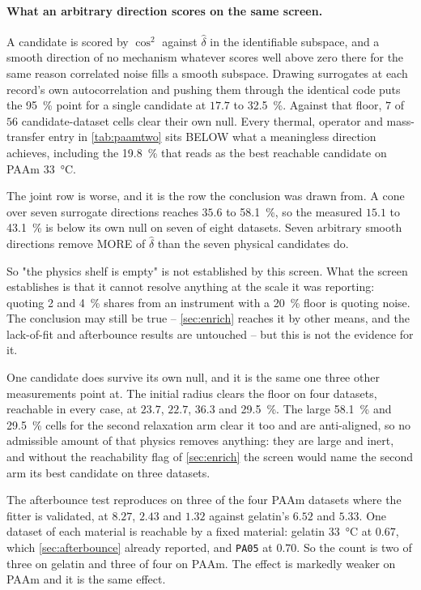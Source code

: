 \documentclass[10pt]{article}
\begin{document}
\paragraph{What an arbitrary direction scores on the same screen.} A candidate is scored by
$\cos^2$ against $\hat\delta$ in the identifiable subspace, and a smooth direction of no
mechanism whatever scores well above zero there for the same reason correlated noise fills a
smooth subspace. Drawing surrogates at each record's own autocorrelation and pushing them
through the identical code puts the \SI{95}{\percent} point for a single candidate at $17.7$ to
\SI{32.5}{\percent}. Against that floor, $7$ of $56$ candidate-dataset cells clear their own
null. Every thermal, operator and mass-transfer entry in \cref{tab:paamtwo} sits BELOW what a
meaningless direction achieves, including the \SI{19.8}{\percent} that reads as the best
reachable candidate on PAAm \SI{33}{\celsius}.

The joint row is worse, and it is the row the conclusion was drawn from. A cone over seven
surrogate directions reaches $35.6$ to \SI{58.1}{\percent}, so the measured $15.1$ to
\SI{43.1}{\percent} is below its own null on seven of eight datasets. Seven arbitrary smooth
directions remove MORE of $\hat\delta$ than the seven physical candidates do.

So "the physics shelf is empty" is not established by this screen. What the screen establishes
is that it cannot resolve anything at the scale it was reporting: quoting \SI{2}{} and
\SI{4}{\percent} shares from an instrument with a \SI{20}{\percent} floor is quoting noise. The
conclusion may still be true -- \cref{sec:enrich} reaches it by other means, and the lack-of-fit
and afterbounce results are untouched -- but this is not the evidence for it.

One candidate does survive its own null, and it is the same one three other measurements point
at. The initial radius clears the floor on four datasets, reachable in every case, at $23.7$,
$22.7$, $36.3$ and \SI{29.5}{\percent}. The large \SI{58.1}{\percent} and \SI{29.5}{\percent}
cells for the second relaxation arm clear it too and are anti-aligned, so no admissible amount
of that physics removes anything: they are large and inert, and without the reachability flag of
\cref{sec:enrich} the screen would name the second arm its best candidate on three datasets.

The afterbounce test reproduces on three of the four PAAm datasets where the fitter is
validated, at $8.27$, $2.43$ and $1.32$ against gelatin's $6.52$ and $5.33$. One dataset of each
material is reachable by a fixed material: gelatin \SI{33}{\celsius} at $0.67$, which
\cref{sec:afterbounce} already reported, and \texttt{PA05} at $0.70$. So the count is two of
three on gelatin and three of four on PAAm. The effect is markedly weaker on PAAm and it is the
same effect.
\end{document}
